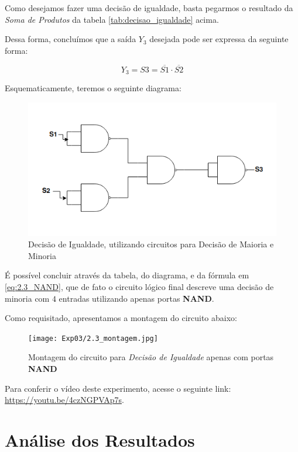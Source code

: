 \documentclass[12pt]{article}
\begin{document}
Como desejamos fazer uma decisão de igualdade, basta pegarmos o resultado da
\textit{Soma de Produtos} da tabela \ref{tab:decisao_igualdade} acima.

Dessa forma, concluímos que a saída \(Y_{3}\) desejada pode ser expressa da
seguinte forma:

\begin{equation}
  Y_{3} = S3 = \overline{S1} \cdot \overline{S2} \label{eq:2.3_NAND}
\end{equation}

Esquematicamente, teremos o seguinte diagrama:

\begin{figure}[H]
    \centering
    \includegraphics[width=.6\textwidth]{Exp03/2.3.png}
    \caption{Decisão de Igualdade, utilizando circuitos para Decisão de Maioria e Minoria}
    \label{fig:decisao_igualdade}
\end{figure}

É possível concluir através da tabela, do diagrama, e da fórmula em
\ref{eq:2.3_NAND}, que de fato o circuito lógico final descreve uma decisão de
minoria com \(4\) entradas utilizando apenas portas \textbf{NAND}.

Como requisitado, apresentamos a montagem do circuito abaixo:

\begin{figure}[H]
    \centering
    \texttt{[image: Exp03/2.3\_montagem.jpg]}
    \caption{Montagem do circuito para \textit{Decisão de Igualdade} apenas com portas \textbf{NAND}}
    \label{fig:decisao_igualdade_montagem}
\end{figure}

Para conferir o vídeo deste experimento, acesse o seguinte link:
\href{https://youtu.be/4czNGPVAp7s}{https://youtu.be/4czNGPVAp7s}.
\\[2em]

\section{Análise dos Resultados}
\label{sec:Resultados}
\end{document}
